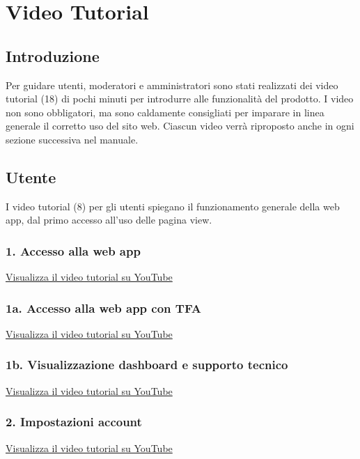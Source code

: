\section{Video Tutorial}

\subsection{Introduzione}

Per guidare utenti, moderatori e amministratori sono stati realizzati dei video tutorial (18) di pochi minuti per introdurre alle funzionalità del prodotto. I video non sono obbligatori, ma sono caldamente consigliati per imparare in linea generale il corretto uso del sito web. Ciascun video verrà riproposto anche in ogni sezione successiva nel manuale.

\subsection{Utente}

I video tutorial (8) per gli utenti spiegano il funzionamento generale della web app, dal primo accesso all'uso delle pagina view.

\subsubsection{1. Accesso alla web app}
\href{https://www.youtube.com/watch?v=PjySMOLCtMA&list=PLPKYjnuIh1FA3b3jn_bwY_ztYzaFn2mIT&index=1}
{Visualizza il video tutorial su YouTube}

\subsubsection{1a. Accesso alla web app con TFA}
\href{https://www.youtube.com/watch?v=PjySMOLCtMA&list=PLPKYjnuIh1FA3b3jn_bwY_ztYzaFn2mIT&index=2}
{Visualizza il video tutorial su YouTube}

\subsubsection{1b. Visualizzazione dashboard e supporto tecnico}
\href{https://www.youtube.com/watch?v=PjySMOLCtMA&list=PLPKYjnuIh1FA3b3jn_bwY_ztYzaFn2mIT&index=3}
{Visualizza il video tutorial su YouTube}

\subsubsection{2. Impostazioni account}
\href{https://www.youtube.com/watch?v=PjySMOLCtMA&list=PLPKYjnuIh1FA3b3jn_bwY_ztYzaFn2mIT&index=4}
{Visualizza il video tutorial su YouTube}

